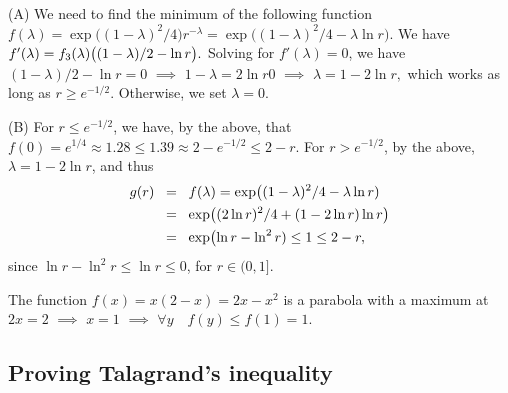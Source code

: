 \begin{tedium}
    (A)
    We need to find the minimum of the following function
    \begin{math}
        f(\lambda) = \exp\bigl( (1-\lambda)^2/4 )r^{-\lambda} =
        \exp\bigl( (1-\lambda)^2/4 -\lambda \ln r ).
    \end{math}
    We have
    \begin{math}
        f'(\lambda) = f_3(\lambda) \pth{\bigl. (1- \lambda)/2 - \ln
           r}.
    \end{math}
    Solving for $f'(\lambda) = 0$, we have
    \begin{math}
        (1- \lambda)/2 - \ln r =0
    \end{math}
    $\implies$
    \begin{math}
        1- \lambda  =2 \ln r0
    \end{math}    
    $\implies$
    \begin{math}
        \lambda = 1- 2 \ln r,
    \end{math}
    which works as long as $r \geq e^{-1/2}$. Otherwise, we set
    $\lambda = 0$.

    (B) For $r \leq e^{-1/2}$, we have, by the above, that
    \begin{math}
        f(0) = e^{1/4} \approx 1.28 \leq 1.39 \approx 2 -e^{-1/2} \leq
        2-r.
    \end{math}
    For $r > e^{-1/2}$, by the above, $\lambda=1-2\ln r$, and thus
    \begin{align*}
        g(r)
        &\EQ
      f(\lambda)%
      =%
      \exp\bigl( (1-\lambda)^2/4 -\lambda \ln r )%
      \\&
      \EQ%
      \exp\bigl( (2 \ln r)^2/4 +(1-2\ln r) \ln r \bigr)
      \\&
      \EQ%
      \exp\bigl(  \ln r - \ln^2 r)
      \leq%
      1 \leq 2-r,
    \end{align*}
    since $\ln r - \ln^2 r \leq \ln r \leq 0$, for $r \in (0,1]$.
\end{tedium}

\begin{tedium}
    The function $f(x) = x(2-x) = 2x - x^2$ is a parabola with a
    maximum at $2x = 2$ $\implies$ $x=1$ $\implies$
    $\forall y \quad f(y) \leq f(1) = 1$.
\end{tedium}

\subsection{Proving Talagrand's inequality}

